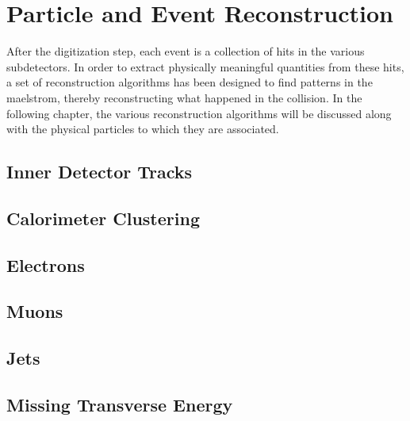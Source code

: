 \chapter{Particle and Event Reconstruction}
\label{chap:reco}

After the digitization step, each event is a collection of hits in the
various subdetectors. In order to extract physically meaningful
quantities from these hits, a set of reconstruction algorithms has
been designed to find patterns in the maelstrom, thereby
reconstructing what happened in the collision. In the following
chapter, the various reconstruction algorithms will be discussed along
with the physical particles to which they are associated. 

\section{Inner Detector Tracks}
\label{chap:reco:sec:tracks}


\section{Calorimeter Clustering}
\label{chap:reco:sec:cluster}

\section{Electrons}
\label{chap:reco:sec:electron}

\section{Muons}
\label{chap:reco:sec:muon}

\section{Jets}
\label{chap:reco:sec:jet}

\section{Missing Transverse Energy}
\label{chap:reco:sec:met}

